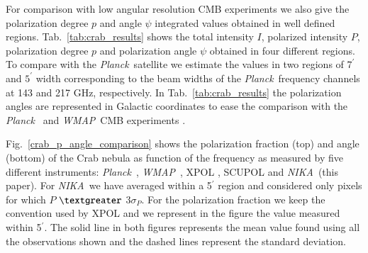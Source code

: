 \documentclass[twocolumn,traditabstract]{aa}
\def\NIKA{\textit{NIKA}}
\def\Planck{\textit{Planck}}
\def\WMAP{\textit{WMAP}}
\begin{document}
For comparison with low angular resolution CMB experiments we also give the polarization degree $p$ and angle $\psi$ integrated values obtained in well defined regions. 
Tab.~\ref{tab:crab_results} shows the total intensity $I$, polarized intensity $P$, polarization degree $p$ and polarization angle $\psi$ obtained in four different regions. To compare with the \Planck\ satellite we estimate the values in two regions of $7^{\prime}$ and $5^{\prime}$ width corresponding to the beam widths of the \Planck\ frequency channels at 143 and 217 GHz, respectively. 
In Tab.~\ref{tab:crab_results} the polarization angles are represented in Galactic coordinates to ease the comparison with the \Planck\ \citep{2015arXiv150702058P} and \WMAP\ CMB experiments \citep{2011ApJS..192...19W}. 

Fig.~\ref{crab_p_angle_comparison} shows the polarization fraction (top) and angle (bottom) of the Crab nebula as function of the frequency as measured by five different instruments: \Planck\ \citep{2015arXiv150702058P}, \WMAP\ \citep{2011ApJS..192...19W}, XPOL \citep{aumont2010}, SCUPOL \citep{scubapol} and \NIKA\ (this paper).
For \NIKA\ we have averaged within a 5$^\prime$ region and considered only pixels for which $P$ $\textgreater$ $3\sigma_P$. 
For the polarization fraction we keep the convention used by XPOL \citep{aumont2010} and we represent in the figure the value measured within 5$^{\prime}$. 
The solid line in both figures represents the mean value found using all the observations shown and the dashed lines represent the standard deviation. 
\end{document}
